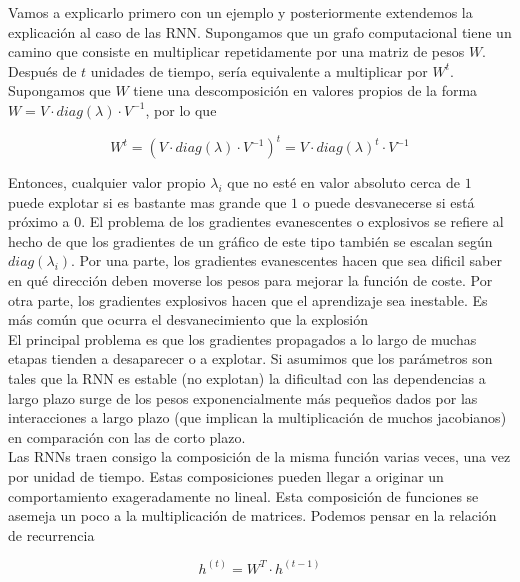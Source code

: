         Vamos a explicarlo primero con un ejemplo y posteriormente extendemos la explicación al caso de las RNN. Supongamos que un grafo computacional tiene un camino que consiste en multiplicar repetidamente por una matriz de pesos $W$. Después de $t$ unidades de tiempo, sería equivalente a multiplicar por $W^t$. Supongamos que $W$ tiene una descomposición en valores propios de la forma $W=V\cdot diag(\lambda) \cdot V^{-1}$, por lo que 
        
        \begin{equation}
            W^t = (V\cdot diag(\lambda) \cdot V^{-1})^t = V\cdot diag(\lambda)^t \cdot V^{-1} 
        \end{equation}
        
        Entonces, cualquier valor propio $\lambda_i$ que no esté en valor absoluto cerca de $1$ puede explotar si es bastante mas grande que $1$ o puede desvanecerse si está próximo a $0$. El problema de los gradientes evanescentes o explosivos se refiere al hecho de que los gradientes de un gráfico de este tipo también se escalan según $diag(\lambda_i)$. Por una parte, los gradientes evanescentes hacen que sea dificil saber en qué dirección deben moverse los pesos para mejorar la función de coste. Por otra parte, los gradientes explosivos hacen que el aprendizaje sea inestable. Es más común que ocurra el desvanecimiento que la explosión\\
        
        El principal problema es que los gradientes propagados a lo largo de muchas etapas tienden a desaparecer o a explotar. Si asumimos que los parámetros son tales que la RNN es estable (no explotan) la dificultad con las dependencias a largo plazo surge de los pesos exponencialmente más pequeños dados por las interacciones a largo plazo (que implican la multiplicación de muchos jacobianos) en comparación con las de corto plazo.\\
        
        Las RNNs traen consigo la composición de la misma función varias veces, una vez por unidad de tiempo. Estas composiciones pueden llegar a originar un comportamiento exageradamente no lineal. Esta composición de funciones se asemeja un poco a la multiplicación de matrices. Podemos pensar en la relación de recurrencia 
        
        \begin{equation}
            h^{(t)} = W^T \cdot h^{(t-1)}
        \end{equation}
        
